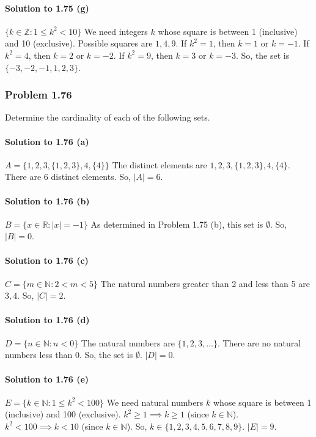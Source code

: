 \documentclass{article}
\begin{document}
\paragraph*{Solution to 1.75 (g)}
$\{k \in \mathbb{Z} : 1 \le k^2 < 10\}$
We need integers $k$ whose square is between 1 (inclusive) and 10 (exclusive).
Possible squares are $1, 4, 9$.
If $k^2 = 1$, then $k = 1$ or $k = -1$.
If $k^2 = 4$, then $k = 2$ or $k = -2$.
If $k^2 = 9$, then $k = 3$ or $k = -3$.
So, the set is $\{-3, -2, -1, 1, 2, 3\}$.

\subsubsection*{Problem 1.76}
Determine the cardinality of each of the following sets.

\paragraph*{Solution to 1.76 (a)}
$A = \{1, 2, 3, \{1, 2, 3\}, 4, \{4\}\}$
The distinct elements are $1, 2, 3, \{1, 2, 3\}, 4, \{4\}$.
There are 6 distinct elements.
So, $|A| = 6$.

\paragraph*{Solution to 1.76 (b)}
$B = \{x \in \mathbb{R} : |x| = -1\}$
As determined in Problem 1.75 (b), this set is $\emptyset$.
So, $|B| = 0$.

\paragraph*{Solution to 1.76 (c)}
$C = \{m \in \mathbb{N} : 2 < m < 5\}$
The natural numbers greater than 2 and less than 5 are $3, 4$.
So, $|C| = 2$.

\paragraph*{Solution to 1.76 (d)}
$D = \{n \in \mathbb{N} : n < 0\}$
The natural numbers are $\{1, 2, 3, \dots\}$. There are no natural numbers less than 0.
So, the set is $\emptyset$.
$|D| = 0$.

\paragraph*{Solution to 1.76 (e)}
$E = \{k \in \mathbb{N} : 1 \le k^2 < 100\}$
We need natural numbers $k$ whose square is between 1 (inclusive) and 100 (exclusive).
$k^2 \ge 1 \implies k \ge 1$ (since $k \in \mathbb{N}$).
$k^2 < 100 \implies k < 10$ (since $k \in \mathbb{N}$).
So, $k \in \{1, 2, 3, 4, 5, 6, 7, 8, 9\}$.
$|E| = 9$.
\end{document}
